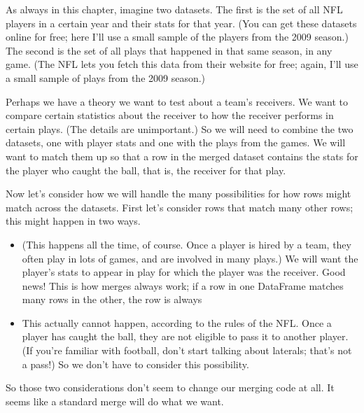 \documentclass[letterpaper,10pt,english]{jupyterBook}
\begin{document}
\sphinxAtStartPar
As always in this chapter, imagine two datasets.  The first is the set of all NFL players in a certain year and their stats for that year.  (You can get these datasets online for free; here I’ll use a small sample of the players from the 2009 season.)  The second is the set of all plays that happened in that same season, in any game.  (The NFL lets you fetch this data from their website for free; again, I’ll use a small sample of plays from the 2009 season.)

\sphinxAtStartPar
Perhaps we have a theory we want to test about a team’s receivers.  We want to compare certain statistics about the receiver to how the receiver performs in certain plays.  (The details are unimportant.)  So we will need to combine the two datasets, one with player stats and one with the plays from the games.  We will want to match them up so that a row in the merged dataset contains the stats for the player who caught the ball, that is, the receiver for that play.

\sphinxAtStartPar
Now let’s consider how we will handle the many possibilities for how rows might match across the datasets.  First let’s consider rows that match many other rows; this might happen in two ways.
\begin{itemize}
\item {} 
\sphinxAtStartPar
{}  (This happens all the time, of course.  Once a player is hired by a team, they often play in lots of games, and are involved in many plays.)  We will want the player’s stats to appear in  play for which the player was the receiver.  Good news!  This is how merges always work; if a row in one DataFrame matches many rows in the other, the row is always 

\item {} 
\sphinxAtStartPar
{}  This actually cannot happen, according to the rules of the NFL.  Once a player has caught the ball, they are not eligible to pass it to another player.  (If you’re familiar with football, don’t start talking about laterals; that’s not a pass!)  So we don’t have to consider this possibility.

\end{itemize}

\sphinxAtStartPar
So those two considerations don’t seem to change our merging code at all.  It seems like a standard merge will do what we want.
\end{document}
